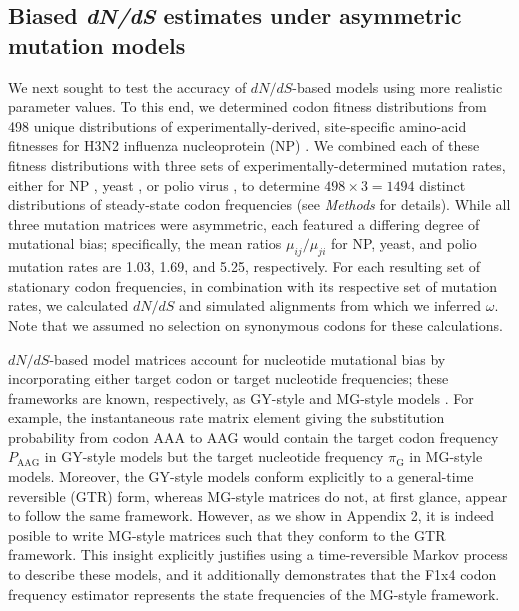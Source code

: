 \documentclass[11pt]{article}
\begin{document}
\subsection*{Biased \emph{dN/dS} estimates under asymmetric mutation models}
We next sought to test the accuracy of $dN/dS$-based models using more realistic parameter values. To this end, we determined codon fitness distributions from 498 unique distributions of experimentally-derived, site-specific amino-acid fitnesses for H3N2 influenza nucleoprotein (NP) \citep{Bloom2014a}. We combined each of these fitness distributions with three sets of experimentally-determined mutation rates, either for NP \citep{Bloom2014a}, yeast \citep{Zhu2014}, or polio virus \citep{Acevedo2014}, to determine $498 \times 3 = 1494$ distinct distributions of steady-state codon frequencies (see \emph{Methods} for details). While all three mutation matrices were asymmetric, each featured a differing degree of mutational bias; specifically, the mean ratios $\mu_{ij} / \mu_{ji}$ for NP, yeast, and polio mutation rates are 1.03, 1.69, and 5.25, respectively. For each resulting set of stationary codon frequencies, in combination with its respective set of mutation rates, we calculated $dN/dS$ and simulated alignments from which we inferred $\omega$. Note that we assumed no selection on synonymous codons for these calculations.

$dN/dS$-based model matrices account for nucleotide mutational bias by incorporating either target codon \citep{GoldmanYang1994} or target nucleotide \citep{MuseGaut1994} frequencies; these frameworks are known, respectively, as GY-style and MG-style models \citep{KosakovskyPond2010}. For example, the instantaneous rate matrix element giving the substitution probability from codon AAA to AAG would contain the target codon frequency $P_\text{AAG}$ in GY-style models but the target nucleotide frequency $\pi_\text{G}$ in MG-style models. Moreover, the GY-style models conform explicitly to a general-time reversible (GTR) form, whereas MG-style matrices do not, at first glance, appear to follow the same framework. However, as we show in Appendix 2, it is indeed posible to write MG-style matrices such that they conform to the GTR framework. This insight explicitly justifies using a time-reversible Markov process to describe these models, and it additionally demonstrates that the F1x4 codon frequency estimator \citep{MuseGaut1994} represents the state frequencies of the MG-style framework.
\end{document}
